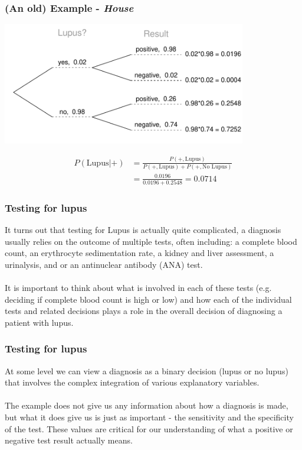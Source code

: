 
\begin{frame}
\frametitle{(An old) Example - \emph{House}}

\begin{center}
\includegraphics[width=0.8\textwidth]{8-4_logistic_reg/figures/tree_lupus.pdf}
\end{center}

{\footnotesize
\begin{align*}
P(\text{Lupus} | +)  &= \frac{P(+,\text{Lupus})}{P(+,\text{Lupus})+P(+,\text{No Lupus})} \\
                     &= \frac{0.0196}{0.0196+0.2548} = 0.0714
\end{align*}
}
\end{frame}


\begin{frame}
\frametitle{Testing for lupus}
It turns out that testing for Lupus is actually quite complicated, a diagnosis usually relies on the outcome of multiple tests, often including: a complete blood count, an erythrocyte sedimentation rate, a kidney and liver assessment, a urinalysis, and or an antinuclear antibody (ANA) test.\\
~\\
It is important to think about what is involved in each of these tests (e.g. deciding if complete blood count is high or low) and how each of the individual tests and related decisions plays a role in the overall decision of diagnosing a patient with lupus.\\

\end{frame}


\begin{frame}
\frametitle{Testing for lupus}

At some level we can view a diagnosis as a binary decision (lupus or no lupus) that involves the complex integration of various explanatory variables.\\
~\\
The example does not give us any information about how a diagnosis is made, but what it does give us is just as important - the sensitivity and the specificity of the test. These values are critical for our understanding of what a positive or negative test result actually means.

\end{frame}

